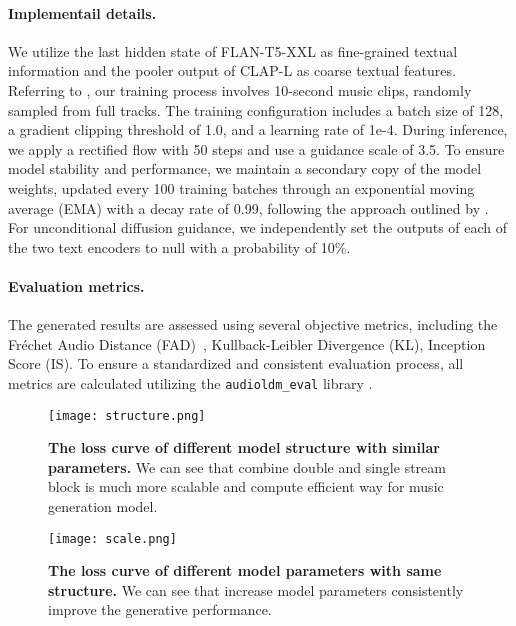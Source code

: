 \paragraph{Implementail details.}
We utilize the last hidden state of FLAN-T5-XXL as fine-grained textual information and the pooler output of CLAP-L as coarse textual features. 
Referring to \cite{liu2024audioldm}, our training process involves 10-second music clips, randomly sampled from full tracks. The training configuration includes a batch size of 128, a gradient clipping threshold of 1.0, and a learning rate of 1e-4.
During inference, we apply a rectified flow with 50 steps and use a guidance scale of 3.5. To ensure model stability and performance, we maintain a secondary copy of the model weights, updated every 100 training batches through an exponential moving average (EMA) with a decay rate of 0.99, following the approach outlined by \citet{Peebles_2023}. For unconditional diffusion guidance, we independently set the outputs of each of the two text encoders to null with a probability of 10\%.

\paragraph{Evaluation metrics.}

The generated results are assessed using several objective metrics, including the Fréchet Audio Distance (FAD)~\citep{kilgour2018fr}, Kullback-Leibler Divergence (KL), Inception Score (IS). 
To ensure a standardized and consistent evaluation process, all metrics are calculated utilizing the \texttt{audioldm\_eval} library \cite{liu2024audioldm}.

\begin{figure}[t]
  \centering
   \texttt{[image: structure.png]}
   \caption{\textbf{The loss curve of different model structure with similar parameters.}  We can see that combine double and single stream block is much more scalable and compute efficient way for music generation model. 
   }
   \label{fig:stream} 
\end{figure} 

\begin{figure}[t]
  \centering
   \texttt{[image: scale.png]}
   \caption{\textbf{The loss curve of different model parameters with same structure. } We can see that increase model parameters consistently improve the generative performance. 
   }
   \label{fig:scale} 
\end{figure} 

